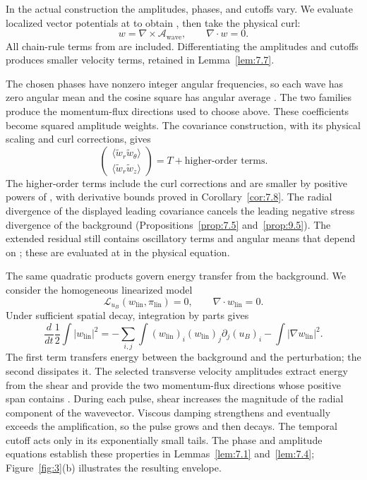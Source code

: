 In the actual construction the amplitudes, phases, and cutoffs vary. We evaluate localized vector
potentials at  to obtain
, then take the physical curl:
\[
 w=\nabla\times\mathcal A_{\mathrm{wave}},\qquad \nabla\cdot w=0.
\]
All chain-rule terms from  are included. Differentiating the amplitudes
and cutoffs produces smaller velocity terms, retained in Lemma~\ref{lem:7.7}.

The chosen phases have nonzero integer angular frequencies, so each wave has zero angular mean and
the cosine square has angular average . The two families produce the
momentum-flux directions used to choose  above. These coefficients
become squared amplitude weights. The covariance construction, with its physical scaling and curl
corrections, gives
\[
 \begin{pmatrix}
  \langle\widetilde w_r\widetilde w_\theta\rangle\\
  \langle\widetilde w_r\widetilde w_z\rangle
 \end{pmatrix}
 =T+\text{higher-order terms}.
\]
The higher-order terms include the curl corrections and are smaller by positive powers of
, with derivative bounds proved in Corollary~\ref{cor:7.8}. The radial
divergence of the displayed leading covariance cancels the leading negative stress divergence of
the background (Propositions~\ref{prop:7.5} and~\ref{prop:9.5}). The extended residual still
contains oscillatory terms and angular means that depend on ; these are
evaluated at  in the physical equation.

The same quadratic products govern energy transfer from the background. We consider the
homogeneous linearized model
\[
 \mathcal L_{u_B}(w_{\mathrm{lin}},\pi_{\mathrm{lin}})=0,
 \qquad \nabla\cdot w_{\mathrm{lin}}=0.
\]
Under sufficient spatial decay, integration by parts gives
\[
 \frac d{dt}\frac12\int|w_{\mathrm{lin}}|^2
 =-\sum_{i,j}\int(w_{\mathrm{lin}})_i(w_{\mathrm{lin}})_j\partial_j(u_B)_i
   -\int|\nabla w_{\mathrm{lin}}|^2.
\]
The first term transfers energy between the background and the perturbation; the second dissipates
it. The selected transverse velocity amplitudes extract energy from the shear and provide the two
momentum-flux directions whose positive span contains . During each pulse,
shear increases the magnitude of the radial component of the wavevector. Viscous damping
strengthens and eventually exceeds the amplification, so the pulse grows and then decays. The
temporal cutoff acts only in its exponentially small tails. The phase and amplitude equations
establish these properties in Lemmas~\ref{lem:7.1} and~\ref{lem:7.4}; Figure~\ref{fig:3}(b)
illustrates the resulting envelope.
